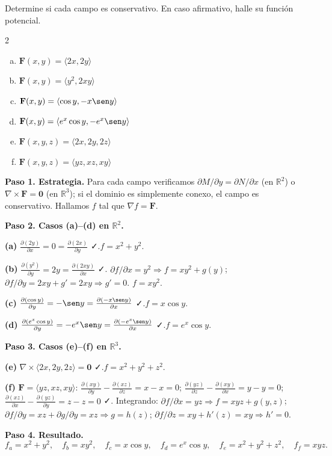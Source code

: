 \begin{prob}
Determine si cada campo es conservativo. En caso afirmativo, halle su
función potencial.
\begin{multicols}{2}
\begin{enumerate}[(a)]
    \item $\mathbf{F}(x,y)=\langle 2x, 2y \rangle$
    \item $\mathbf{F}(x,y)=\langle y^2, 2xy \rangle$
    \item $\mathbf{F}(x,y)=\langle \cos y, -x\sen y \rangle$
    \item $\mathbf{F}(x,y)=\langle e^x \cos y, -e^x \sen y \rangle$
    \item $\mathbf{F}(x,y,z)=\langle 2x, 2y, 2z \rangle$
    \item $\mathbf{F}(x,y,z)=\langle yz, xz, xy \rangle$
\end{enumerate}
\end{multicols}
\begin{myproof}
\textbf{Paso 1. Estrategia.} Para cada campo verificamos $\partial M/\partial y=\partial N/\partial x$ (en $\mathbb{R}^2$) o $\nabla\times\mathbf{F}=\mathbf{0}$ (en $\mathbb{R}^3$); si el dominio es simplemente conexo, el campo es conservativo. Hallamos $f$ tal que $\nabla f=\mathbf{F}$.

\textbf{Paso 2. Casos (a)--(d) en $\mathbb{R}^2$.}

\textbf{(a)} $\tfrac{\partial(2y)}{\partial x}=0=\tfrac{\partial(2x)}{\partial y}$ ✓.\quad $f=x^2+y^2$.

\textbf{(b)} $\tfrac{\partial(y^2)}{\partial y}=2y=\tfrac{\partial(2xy)}{\partial x}$ ✓. $\partial f/\partial x=y^2\Rightarrow f=xy^2+g(y)$;\; $\partial f/\partial y=2xy+g'=2xy\Rightarrow g'=0$. $f=xy^2$.

\textbf{(c)} $\tfrac{\partial(\cos y)}{\partial y}=-\sen y=\tfrac{\partial(-x\sen y)}{\partial x}$ ✓.\quad $f=x\cos y$.

\textbf{(d)} $\tfrac{\partial(e^x\cos y)}{\partial y}=-e^x\sen y=\tfrac{\partial(-e^x\sen y)}{\partial x}$ ✓.\quad $f=e^x\cos y$.

\textbf{Paso 3. Casos (e)--(f) en $\mathbb{R}^3$.}

\textbf{(e)} $\nabla\times\langle2x,2y,2z\rangle=\mathbf{0}$ ✓.\quad $f=x^2+y^2+z^2$.

\textbf{(f)} $\mathbf{F}=\langle yz,xz,xy\rangle$: $\tfrac{\partial(xy)}{\partial y}-\tfrac{\partial(xz)}{\partial z}=x-x=0$;\; $\tfrac{\partial(yz)}{\partial z}-\tfrac{\partial(xy)}{\partial x}=y-y=0$;\; $\tfrac{\partial(xz)}{\partial x}-\tfrac{\partial(yz)}{\partial y}=z-z=0$ ✓. Integrando: $\partial f/\partial x=yz\Rightarrow f=xyz+g(y,z)$; $\partial f/\partial y=xz+\partial g/\partial y=xz\Rightarrow g=h(z)$; $\partial f/\partial z=xy+h'(z)=xy\Rightarrow h'=0$.

\textbf{Paso 4. Resultado.}
\[
\boxed{f_a=x^2+y^2,\quad f_b=xy^2,\quad f_c=x\cos y,\quad f_d=e^x\cos y,\quad f_e=x^2+y^2+z^2,\quad f_f=xyz.}
\]
\end{myproof}
\end{prob}

